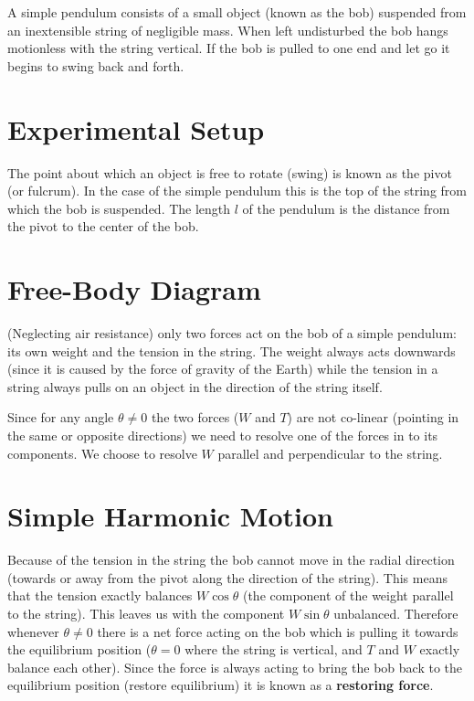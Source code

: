 A simple pendulum consists of a small object (known as the bob) suspended from an inextensible string of negligible mass. When left undisturbed the bob hangs motionless with the string vertical. If the bob is pulled to one end and let go it begins to swing back and forth.

\section{Experimental Setup}

   

   The point about which an object is free to rotate (swing) is known as the pivot (or fulcrum). In the case of the simple pendulum this is the top of the string from which the bob is suspended. The length $l$ of the pendulum is the distance from the pivot to the center of the bob.

\section{Free-Body Diagram}

   (Neglecting air resistance) only two forces act on the bob of a simple pendulum: its own weight and the tension in the string. The weight always acts downwards (since it is caused by the force of gravity of the Earth) while the tension in a string always pulls on an object in the direction of the string itself.

   

   Since for any angle $\theta \neq 0$ the two forces ($W$ and $T$) are not co-linear (pointing in the same or opposite directions) we need to resolve one of the forces in to its components. We choose to resolve $W$ parallel and perpendicular to the string.

   

\section{Simple Harmonic Motion}

   Because of the tension in the string the bob cannot move in the radial direction (towards or away from the pivot along the direction of the string). This means that the tension exactly balances $W \cos \theta$ (the component of the weight parallel to the string). This leaves us with the component $W \sin \theta$ unbalanced. Therefore whenever $\theta \neq 0$ there is a net force acting on the bob which is pulling it towards the equilibrium position ($\theta = 0$ where the string is vertical, and $T$ and $W$ exactly balance each other). Since the force is always acting to bring the bob back to the equilibrium position (restore equilibrium) it is known as a \textbf{restoring force}.

